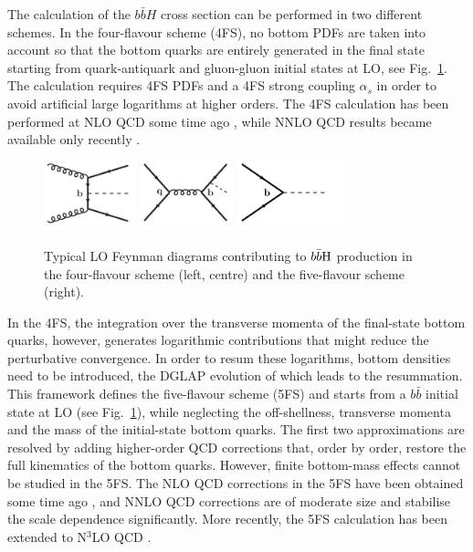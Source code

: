 \documentclass[11pt,a4paper]{article}
\begin{document}
The calculation of the $b\bar bH$ cross section can be performed in two different schemes. In the four-flavour scheme (4FS), no bottom PDFs are taken into account so that the bottom quarks are entirely generated in the final state starting from quark-antiquark and gluon-gluon initial states at LO, see Fig.~\ref{fig:bbhlo}. The calculation requires 4FS PDFs and a 4FS strong coupling $\alpha_s$ in order to avoid artificial large logarithms at higher orders. The 4FS calculation has been performed at NLO QCD some time ago \cite{dittmaier:2003ej,dawson:2003kb}, while NNLO QCD results became available only recently \cite{Biello:2024pgo}.
\begin{figure}[hbt]
\begin{center}
    \includegraphics[height=2cm]{./diags/gg-bbH.pdf}\hspace*{2cm}
    \includegraphics[height=2cm]{./diags/qq-bbH.pdf}\hspace*{2cm}
    \includegraphics[height=2cm]{./diags/bb-H.pdf}
	\vspace{0.2cm}
  \caption{Typical LO Feynman diagrams contributing to $b\bar{b}\text{H}$ production in
the four-flavour scheme (left, centre) and the five-flavour scheme (right).}
  \label{fig:bbhlo}
\end{center}
\end{figure}

In the 4FS, the integration over the transverse momenta of the final-state bottom quarks, however, generates logarithmic contributions that might reduce the perturbative convergence. In order to resum these logarithms, bottom densities need to be introduced, the DGLAP evolution of which leads to the resummation. This framework defines the five-flavour scheme (5FS) and starts from a $b\bar b$ initial state at LO (see Fig.~\ref{fig:bbhlo}), while neglecting the off-shellness, transverse momenta and the mass of the initial-state bottom quarks. The first two approximations are resolved by adding higher-order QCD corrections that, order by order, restore the full kinematics of the bottom quarks. However, finite bottom-mass effects cannot be studied in the 5FS. The NLO QCD corrections in the 5FS have been obtained some time ago \cite{dicus:1998hs,balazs:1998bm}, and NNLO QCD corrections are of moderate size \cite{harlander_2003} and stabilise the scale dependence significantly. More recently, the 5FS calculation has been extended to N$^3$LO QCD \cite{duhr:2019kwi}.
\end{document}
